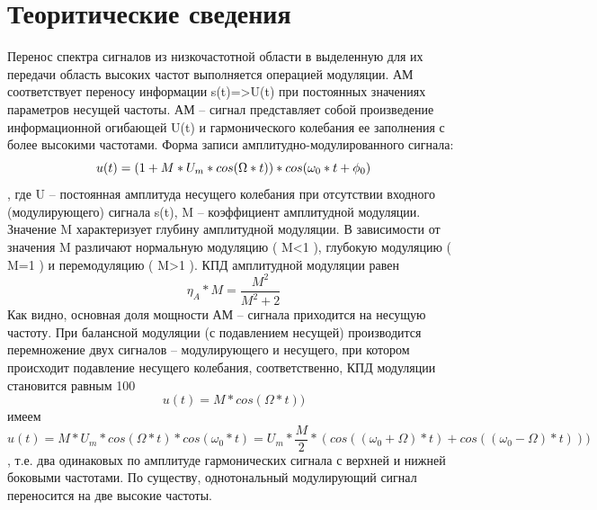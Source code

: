 \documentclass[10pt,a4paper]{report}
\begin{document}
\chapter{Теоритические сведения}
Перенос спектра сигналов из низкочастотной области в выделенную для их передачи область высоких частот выполняется операцией модуляции.
АМ соответствует переносу информации s(t)=>U(t) при постоянных значениях параметров несущей частоты. АМ – сигнал представляет собой произведение информационной огибающей U(t)  и гармонического колебания ее заполнения с более высокими частотами.
Форма записи амплитудно-модулированного сигнала:
\begin{displaymath}
u(t)=(1+M*U_{m}*cos(\Omega*t))*cos(\omega_{0}*t+\phi_{0})\newline
\end{displaymath}
, где U – постоянная амплитуда несущего колебания при отсутствии входного (модулирующего) сигнала s(t), M  – коэффициент амплитудной модуляции. Значение  M характеризует глубину амплитудной модуляции. В зависимости от значения  M различают нормальную модуляцию ( M<1 ), глубокую модуляцию ( M=1 ) и перемодуляцию ( M>1 ).
КПД амплитудной модуляции равен 
\begin{displaymath}
\eta_{A}*M=\frac{M^{2}}{M^{2}+2}
\end{displaymath}
Как видно, основная доля мощности АМ – сигнала приходится на несущую частоту. При балансной модуляции (с подавлением несущей) производится перемножение двух сигналов – модулирующего и несущего, при котором происходит подавление несущего колебания, соответственно, КПД модуляции становится равным 100%
\begin{displaymath}
u(t)=M*cos(\Omega*t))
\end{displaymath}  имеем
\begin{displaymath}
u(t)=M*U_{m}*cos(\Omega*t)*cos(\omega_{0}*t)=U_{m}*\frac{M}{2}*(cos((\omega_{0}+\Omega)*t)+cos((\omega_{0}-\Omega)*t)))
\end{displaymath}
 , т.е. два одинаковых по амплитуде гармонических сигнала с верхней и нижней боковыми частотами. По существу, однотональный модулирующий сигнал переносится на две высокие частоты.
\end{document}
